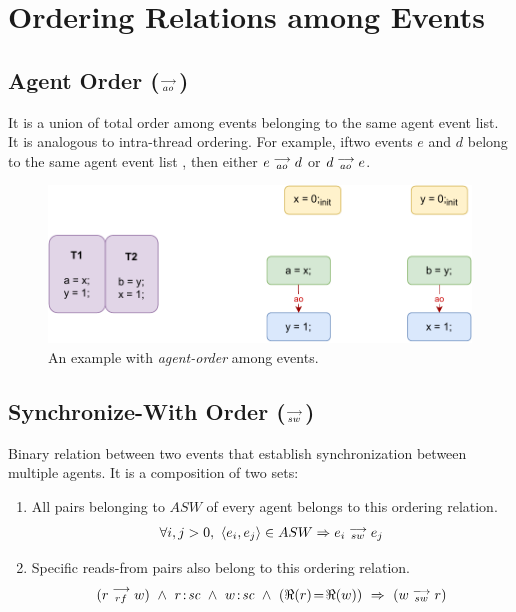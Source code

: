 \section{Ordering Relations among Events}
        
    \subsection{Agent Order ($\stackrel{\longrightarrow}{_{ao}}$)}
        It is a union of total order among events belonging to the same agent event list. It is analogous to intra-thread ordering. For example, iftwo events $e$ and $d$ belong to the same agent event list , then either $e\stackrel{\longrightarrow}{_{ao}}d$ or $d\stackrel{\longrightarrow}{_{ao}}e$. 
        
        \begin{figure}[H]
            \centering
            \includegraphics[scale=0.7]{4.ECMAScriptMemoryModel/AgentOrder.pdf}
            \caption{An example with \textit{agent-order} among events.}
        \end{figure}
    
    \subsection{Synchronize-With Order ($\stackrel{\longrightarrow}{_{sw}} $)}
       Binary relation between two events that establish synchronization between multiple agents. It is a composition of two sets: 
        \begin{enumerate}
            \item All pairs belonging to $ASW$ of every agent belongs to this ordering relation. 
                \begin{align*}
                    \forall{i, j > 0}, \ \langle e_i, e_j \rangle \in ASW \Rightarrow{} e_i\stackrel{\longrightarrow}{_{sw}}e_j 
                \end{align*}
                    
            \item Specific reads-from pairs also belong to this ordering relation\footnotemark. 
                \begin{align*}
                    (\reln{r}{rf}{w}) \ \wedge \ \et{r}{sc} \ \wedge \ \et{w}{sc} \ \wedge \ (\Re(r)\!=\!\Re(w)) \ \Rightarrow{} \
                    (\reln{w}{sw}{r})
                \end{align*}
                    
        \end{enumerate}
        
